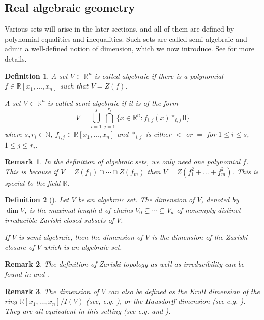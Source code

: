 \documentclass[pdflatex,sn-mathphys-num]{sn-jnl}%
\theoremstyle{thmstyleone}%
\theoremstyle{thmstyletwo}%
\newtheorem{remark}{Remark}%
\theoremstyle{thmstylethree}%
\newtheorem{definition}{Definition}%
\newcommand{\R}{\mathbb{R}}
\newcommand{\N}{\mathbb{N}}
\begin{document}
\subsection{Real algebraic geometry}
Various sets will arise in the later sections, and all of them are defined by polynomial equalities and inequalities. Such sets are called semi-algebraic and admit a well-defined notion of dimension, which we now introduce. See \cite{bochnak2013real} for more details.
\begin{definition}
	A set $V\subset\R^n$ is called \textit{algebraic} if there is a polynomial $f\in \R[x_1,\dots,x_n]$ such that $V=Z(f)$.
	
	A set $V\subset\R^n$ is called \textit{semi-algebraic} if it is of the form
	\[V=\bigcup_{i=1}^s\bigcap_{j=1}^{r_i}\{x\in \R^n:f_{i,j}(x)*_{i,j}0\}\]
	where $s,r_i\in \N$, $f_{i,j}\in \R[x_1,\dots,x_n]$ and $*_{i,j}$ is either $<$ or $=$ for $1\le i\le s$, $1\le j\le r_i$.
\end{definition}
\begin{remark}
	In the definition of algebraic sets, we only need one polynomial $f$. This is because if $V=Z(f_1)\cap \cdots\cap Z(f_m)$ then $V=Z(f_1^2+\dots+f_m^2)$. This is special to the field $\R$.
\end{remark}
\begin{definition}[{\cite[page 5]{hartshorne1977algebraic}}]\label{dimension}
	Let $V$ be an algebraic set. The \textit{dimension} of $V$, denoted by $\dim V$, is the maximal length $d$ of chains $V_0\subsetneq\cdots\subsetneq V_d$ of nonempty distinct irreducible Zariski closed subsets of $V$.
	
	If $V$ is semi-algebraic, then the dimension of $V$ is the dimension of the Zariski closure of $V$ which is an algebraic set.
\end{definition}
\begin{remark}
	The definition of Zariski topology as well as irreducibility can be found in \cite[Theorem 2.8.3]{bochnak2013real} and \cite[page 2,3]{hartshorne1977algebraic}.
\end{remark}
\begin{remark}
	The dimension of $V$ can also be defined as the Krull dimension of the ring $\R[x_1,\dots,x_n]/I(V)$ (see, e.g. \cite[Definition 2.8.1]{bochnak2013real}), or the Hausdorff dimension (see e.g. \cite{morgan2016gmt}). They are all equivalent in this setting (see e.g. \cite[Proposition 1.7]{hartshorne1977algebraic} and \cite[Corollary 2.8.9, Proposition 2.9.10]{bochnak2013real}).
\end{remark}
\end{document}
